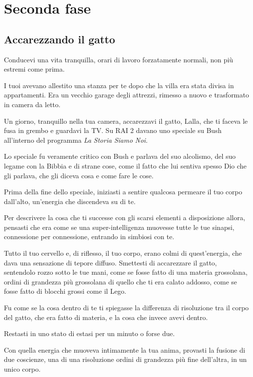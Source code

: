 \chapter{Seconda fase}
\label{seconda fase} %

\section{Accarezzando il gatto}
\label{accarezzando_il_gatto}

Conducevi una vita tranquilla, orari di lavoro forzatamente normali, non più estremi come prima.

I tuoi avevano allestito una stanza per te dopo che la villa era stata divisa in appartamenti. Era un vecchio garage degli attrezzi, rimesso a nuovo e trasformato in camera da letto.

Un giorno, tranquillo nella tua camera, accarezzavi il gatto, Lalla, che ti faceva le fusa in grembo e guardavi la TV. Su RAI 2 davano uno speciale su Bush all'interno del programma \textit{La Storia Siamo Noi}.

Lo speciale fu veramente critico con Bush e parlava del suo alcolismo, del suo legame con la Bibbia e di strane cose, come il fatto che lui sentiva spesso Dio che gli parlava, che gli diceva cosa e come fare le cose.

Prima della fine dello speciale, iniziasti a sentire qualcosa permeare il tuo corpo dall'alto, un'energia che discendeva su di te.

Per descrivere la cosa che ti successe con gli scarsi elementi a disposizione allora, pensasti che era come se una super-intelligenza muovesse tutte le tue sinapsi, connessione per connessione, entrando in simbiosi con te.

Tutto il tuo cervello e, di riflesso, il tuo corpo, erano colmi di quest'energia, che dava una sensazione di tepore diffuso. Smettesti di accarezzare il gatto, sentendolo rozzo sotto le tue mani, come se fosse fatto di una materia grossolana, ordini di grandezza più grossolana di quello che ti era calato addosso, come se fosse fatto di blocchi grossi come il Lego.

Fu come se la cosa dentro di te ti spiegasse la differenza di risoluzione tra il corpo del gatto, che era fatto di materia, e la cosa che invece avevi dentro.

Restasti in uno stato di estasi per un minuto o forse due.

Con quella energia che muoveva intimamente la tua anima, provasti la fusione di due coscienze, una di una risoluzione ordini di grandezza più fine dell'altra, in un unico corpo.

